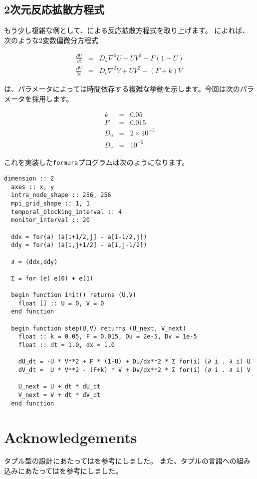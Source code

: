\documentclass{jsarticle}
\newcommand{\formura}{{\texttt{formura}}}
\begin{document}
\subsection{2次元反応拡散方程式}

もう少し複雑な例として、\citet{pearson1993complex}による反応拡散方程式を取り上げます。
\citet{pearson1993complex}によれば、次のような2変数偏微分方程式

\begin{eqnarray}
  \frac{\partial U}{\partial t} &=& D_u \nabla^2 U - UV^2 + F(1-U)\\
  \frac{\partial V}{\partial t} &=& D_v \nabla^2 V + UV^2 - (F+k)V
\end{eqnarray}

は、パラメータによっては時間依存する複雑な挙動を示します。今回は次のパラメータを採用します。

\begin{eqnarray}
  k &=& 0.05\\
  F &=& 0.015\\
  D_u &=& 2 \times 10^{-5}\\
  D_v &=& 10^{-5}
\end{eqnarray}

これを実装した\formura プログラムは次のようになります。

\begin{lstlisting}[mathescape]
  dimension :: 2
  axes :: x, y
  intra_node_shape :: 256, 256
  mpi_grid_shape :: 1, 1
  temporal_blocking_interval :: 4
  monitor_interval :: 20

  ddx = for(a) (a[i+1/2,j] - a[i-1/2,j])
  ddy = for(a) (a[i,j+1/2] - a[i,j-1/2])

  ∂ = (ddx,ddy)

  Σ = for (e) e(0) + e(1)

  begin function init() returns (U,V)
    float [] :: U = 0, V = 0
  end function

  begin function step(U,V) returns (U_next, V_next)
    float :: k = 0.05, F = 0.015, Du = 2e-5, Dv = 1e-5
    float :: dt = 1.0, dx = 1.0

    dU_dt = -U * V**2 + F * (1-U) + Du/dx**2 * Σ for(i) (∂ i . ∂ i) U
    dV_dt =  U * V**2 - (F+k) * V + Dv/dx**2 * Σ for(i) (∂ i . ∂ i) V

    U_next = U + dt * dU_dt
    V_next = V + dt * dV_dt
  end function
\end{lstlisting}

\newpage



\section*{Acknowledgements}

タプル型の設計にあたっては\citet{pierce2002types}を参考にしました。
また、タプルの言語への組み込みにあたっては\citet{oliveira2015modular}を参考にしました。





\end{document}
